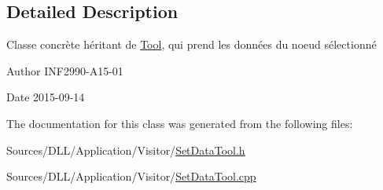 \subsection{Detailed Description}
Classe concrète héritant de \hyperlink{class_tool}{Tool}, qui prend les données du noeud sélectionné 

\begin{DoxyAuthor}{Author}
I\+N\+F2990-\/\+A15-\/01 
\end{DoxyAuthor}
\begin{DoxyDate}{Date}
2015-\/09-\/14 
\end{DoxyDate}


The documentation for this class was generated from the following files\+:\begin{DoxyCompactItemize}
\item 
Sources/\+D\+L\+L/\+Application/\+Visitor/\hyperlink{_set_data_tool_8h}{Set\+Data\+Tool.\+h}\item 
Sources/\+D\+L\+L/\+Application/\+Visitor/\hyperlink{_set_data_tool_8cpp}{Set\+Data\+Tool.\+cpp}\end{DoxyCompactItemize}
